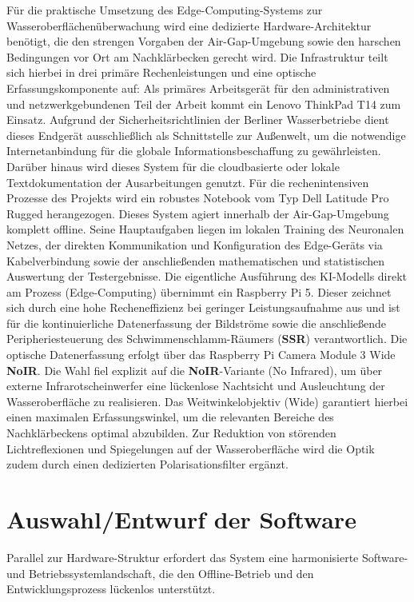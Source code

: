 Für die praktische Umsetzung des Edge-Computing-Systems zur Wasseroberflächenüberwachung wird eine dedizierte Hardware-Architektur benötigt, die den strengen Vorgaben der Air-Gap-Umgebung sowie den harschen Bedingungen vor Ort am Nachklärbecken gerecht wird. Die Infrastruktur teilt sich hierbei in drei primäre Rechenleistungen und eine optische Erfassungskomponente auf:  Als primäres Arbeitsgerät für den administrativen und netzwerkgebundenen Teil der Arbeit kommt ein Lenovo ThinkPad T14 zum Einsatz. Aufgrund der Sicherheitsrichtlinien der Berliner Wasserbetriebe dient dieses Endgerät ausschließlich als Schnittstelle zur Außenwelt, um die notwendige Internetanbindung für die globale Informationsbeschaffung zu gewährleisten. Darüber hinaus wird dieses System für die cloudbasierte oder lokale Textdokumentation der Ausarbeitungen genutzt.  Für die rechenintensiven Prozesse des Projekts wird ein robustes Notebook vom Typ Dell Latitude Pro Rugged herangezogen. Dieses System agiert innerhalb der Air-Gap-Umgebung komplett offline. Seine Hauptaufgaben liegen im lokalen Training des Neuronalen Netzes, der direkten Kommunikation und Konfiguration des Edge-Geräts via Kabelverbindung sowie der anschließenden mathematischen und statistischen Auswertung der Testergebnisse.  Die eigentliche Ausführung des KI-Modells direkt am Prozess (Edge-Computing) übernimmt ein Raspberry Pi 5. Dieser zeichnet sich durch eine hohe Recheneffizienz bei geringer Leistungsaufnahme aus und ist für die kontinuierliche Datenerfassung der Bildströme sowie die anschließende Peripheriesteuerung des Schwimmenschlamm-Räumers (\textbf{SSR}) verantwortlich.  Die optische Datenerfassung erfolgt über das Raspberry Pi Camera Module 3 Wide \textbf{NoIR}. Die Wahl fiel explizit auf die \textbf{NoIR}-Variante  (No Infrared), um über externe Infrarotscheinwerfer eine lückenlose Nachtsicht und Ausleuchtung der Wasseroberfläche zu realisieren. Das Weitwinkelobjektiv (Wide) garantiert hierbei einen maximalen Erfassungswinkel, um die relevanten Bereiche des Nachklärbeckens optimal abzubilden. Zur Reduktion von störenden Lichtreflexionen und Spiegelungen auf der Wasseroberfläche wird die Optik zudem durch einen dedizierten Polarisationsfilter ergänzt.

\section{Auswahl/Entwurf der Software}
Parallel zur Hardware-Struktur erfordert das System eine harmonisierte Software- und Betriebssystemlandschaft, die den Offline-Betrieb und den Entwicklungsprozess lückenlos unterstützt.


